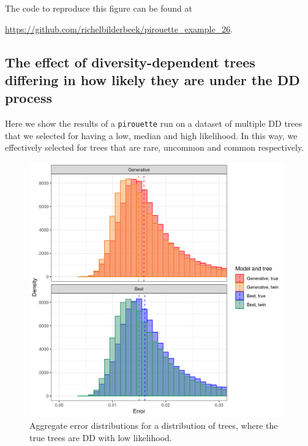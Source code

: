 The code to reproduce this figure can be found at
\begin{sloppypar}
  \url{https://github.com/richelbilderbeek/pirouette_example_26}.
\end{sloppypar}

\newpage

\subsection{The effect of diversity-dependent trees differing in how likely they are under the DD process}
\label{subsec:better_label_needed}

Here we show the results of a \verb;pirouette; run on a dataset 
of multiple DD trees that we selected for having a low, median
and high likelihood. In this way, we effectively selected for trees
that are rare, uncommon and common respectively.

\begin{figure}[H]
  \includegraphics[width=0.98\textwidth]{pirouette_example_23/errors_low.png}
  \caption{Aggregate error distributions for a distribution of trees, where the true trees are DD with low likelihood.}
\end{figure}

